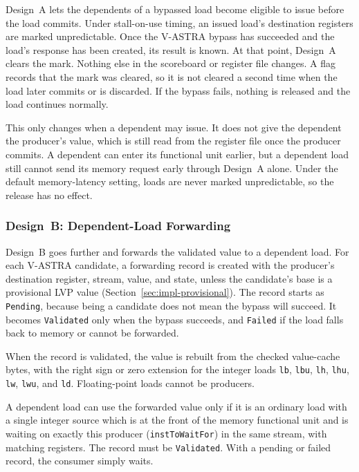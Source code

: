 Design~A lets the dependents of a bypassed load become eligible to
issue before the load commits. Under stall-on-use timing, an issued
load's destination registers are marked unpredictable. Once the
V-ASTRA bypass has succeeded and the load's response has been
created, its result is known. At that point, Design~A clears the
mark. Nothing else in the scoreboard or register file changes. A flag
records that the mark was cleared, so
it is not cleared a second time when the load later commits or is
discarded. If the bypass fails, nothing is released and the load
continues normally.

This only changes when a dependent may issue. It does not give the
dependent the producer's value, which is still read from the register
file once the producer commits. A dependent can enter its functional
unit earlier, but a dependent load still cannot send its memory
request early through Design~A alone. Under the default memory-latency
setting, loads are never marked unpredictable, so the release has no
effect.

\subsubsection{Design~B: Dependent-Load Forwarding}

Design~B goes further and forwards the validated value to a dependent
load. For each V-ASTRA candidate, a forwarding record is created with
the producer's destination register, stream, value, and state, unless
the candidate's base is a provisional LVP value
(Section~\ref{sec:impl-provisional}). The record starts as
\texttt{Pending}, because being a candidate does not mean the bypass
will succeed. It becomes \texttt{Validated} only when the bypass
succeeds, and \texttt{Failed} if the load falls back to memory or
cannot be forwarded.

When the record is validated, the value is rebuilt from the checked
value-cache bytes, with the right sign or zero extension for the
integer loads \texttt{lb}, \texttt{lbu}, \texttt{lh}, \texttt{lhu},
\texttt{lw}, \texttt{lwu}, and \texttt{ld}. Floating-point loads
cannot be producers.

A dependent load can use the forwarded value only if it is an ordinary
load with a single integer source which is at the front of the memory
functional unit and is waiting on exactly this producer
(\texttt{instToWaitFor}) in the same stream, with matching registers.
The record must be \texttt{Validated}. With a pending or failed
record, the consumer simply waits.

